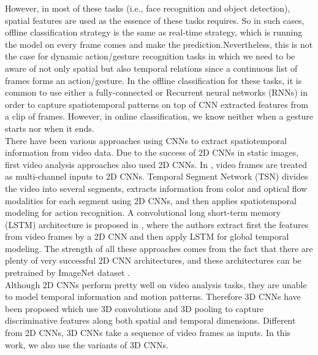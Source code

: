 However, in most of these tasks (i.e., face recognition and object detection), spatial features are used as the essence of these tasks requires.  So in such cases, offline classification strategy is the same as real-time strategy,  which is running the model on every frame comes and make the prediction.Nevertheless,  this is not the case for dynamic action/gesture recognition tasks in which we need to be aware of not only spatial but also temporal relations since a continuous list of frames forms an action/gesture.  In the offline classification for these tasks,  it is common to use either  a fully-connected  or Recurrent neural networks (RNNs) in order to capture spatiotemporal patterns on top of CNN extracted features from a clip of frames. However, in online classification, we know neither when a gesture starts nor when it ends.\\

There have been various approaches using CNNs to extract spatiotemporal information from video data.   Due to the success of 2D CNNs in static images, first video analysis approaches also used 2D CNNs.  In \cite{Feichtenhofer2016convolutional, simonyan2014two, Karpathy2014largescale, Wang2015towards}, video frames are treated as multi-channel inputs to 2D CNNs.  Temporal  Segment Network  (TSN) \cite{wang2016temporal} divides the video into several segments, extracts information from color and optical flow modalities for each segment using 2D CNNs, and then applies spatiotemporal modeling for action recognition.  A convolutional long short-term memory (LSTM) architecture is proposed in \cite{donahue2015long}, where the authors extract first the features from video frames by a 2D CNN and then apply LSTM for global temporal modeling.  The strength of all these approaches comes from the fact that there are plenty of very successful 2D CNN architectures, and these architectures can be pretrained by ImageNet dataset \cite{deng2009imagenet}.\\

Although  2D CNNs perform pretty well on video analysis tasks, they are unable to model temporal information and motion patterns.  Therefore  3D CNNs have been proposed \cite{tran2015learning, tran2017convnet, hara3dcnns, varol2017long} which use 3D convolutions and 3D pooling to capture discriminative features along both spatial and temporal dimensions. Different from 2D CNNs, 3D CNNs take a sequence of video frames as inputs.  In this work, we also use the variants of 3D CNNs.\\

